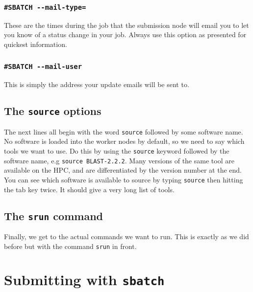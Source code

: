 \documentclass[]{book}
\begin{document}
\hypertarget{sbatch---mail-type}{%
\subsubsection{\texorpdfstring{\texttt{\#SBATCH\ -\/-mail-type=}}{\#SBATCH -\/-mail-type=}}\label{sbatch---mail-type}}

These are the times during the job that the submission node will email you to let you know of a status change in your job. Always use this option as presented for quickest information.

\hypertarget{sbatch---mail-user}{%
\subsubsection{\texorpdfstring{\texttt{\#SBATCH\ -\/-mail-user}}{\#SBATCH -\/-mail-user}}\label{sbatch---mail-user}}

This is simply the address your update emails will be sent to.

\hypertarget{the-source-options}{%
\subsection{\texorpdfstring{The \texttt{source} options}{The source options}}\label{the-source-options}}

The next lines all begin with the word \texttt{source} followed by some software name. No software is loaded into the worker nodes by default, so we need to say which tools we want to use. Do this by using the \texttt{source} keyword followed by the software name, e.g \texttt{source\ BLAST-2.2.2}. Many versions of the same tool are available on the HPC, and are differentiated by the version number at the end. You can see which software is available to source by typing \texttt{source} then hitting the tab key twice. It should give a very long list of tools.

\hypertarget{the-srun-command}{%
\subsection{\texorpdfstring{The \texttt{srun} command}{The srun command}}\label{the-srun-command}}

Finally, we get to the actual commands we want to run. This is exactly as we did before but with the command \texttt{srun} in front.

\hypertarget{submitting-with-sbatch}{%
\section{\texorpdfstring{Submitting with \texttt{sbatch}}{Submitting with sbatch}}\label{submitting-with-sbatch}}
\end{document}
